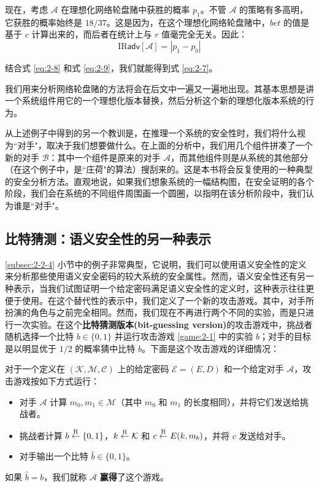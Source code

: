 现在，考虑 $\mathcal{A}$ 在理想化网络轮盘赌中获胜的概率 $p_1$。不管 $\mathcal{A}$ 的策略有多高明，它获胜的概率始终是 $18/37$。这是因为，在这个理想化网络轮盘赌中，$\mathit{bet}$ 的值是基于 $c$ 计算出来的，而后者在统计上与 $r$ 值毫完全无关。因此：
\begin{equation}\label{eq:2-9}
\mathrm{IR}\mathsf{adv}[\mathcal{A}]
=
|p_1-p_0|
\end{equation}

结合式 \ref{eq:2-8} 和式 \ref{eq:2-9}，我们就能得到式 \ref{eq:2-7}。

\vspace{5pt}

我们用来分析网络轮盘赌的方法将会在后文中一遍又一遍地出现。其基本思想是讲一个系统组件用它的一个理想化版本替换，然后分析这个新的理想化版本系统的行为。

从上述例子中得到的另一个教训是，在推理一个系统的安全性时，我们将什么视为``对手"，取决于我们想要做什么。在上面的分析中，我们用几个组件拼凑了一个新的对手 $\mathcal{B}$：其中一个组件是原来的对手 $\mathcal{A}$，而其他组件则是从系统的其他部分（在这个例子中，是``庄荷"的算法）搜刮来的。这是本书将会反复使用的一种典型的安全分析方法。直观地说，如果我们想象系统的一幅结构图，在安全证明的各个阶段，我们会在系统的不同组件周围画一个圆圈，以指明在该分析阶段中，我们认为谁是``对手"。

\subsection{比特猜测：语义安全性的另一种表示}\label{subsec:2-2-5}

\ref{subsec:2-2-4} 小节中的例子非常典型，它说明，我们可以使用语义安全性的定义来分析那些使用语义安全密码的较大系统的安全属性。然而，语义安全性还有另一种表示，当我们试图证明一个给定密码满足语义安全性的定义时，这种表示往往更便于使用。在这个替代性的表示中，我们定义了一个新的攻击游戏。其中，对手所扮演的角色与之前完全相同。然而，我们现在不再进行两个不同的实验，而是只进行一次实验。在这个\textbf{比特猜测版本(bit-guessing version)}的攻击游戏中，挑战者随机选择一个比特 $b\in\{0,1\}$ 并运行攻击游戏 \ref{game:2-1} 中的实验 $b$；对手的目标是以明显优于 $1/2$ 的概率猜中比特 $b$。下面是这个攻击游戏的详细情况：

\begin{game}\label{game:2-4}
对于一个定义在 $(\mathcal{K},\mathcal{M},\mathcal{C})$ 上的给定密码 $\mathcal{E}=(E,D)$ 和一个给定对手 $\mathcal{A}$，攻击游戏按如下方式运行：
\begin{itemize}
	\item 对手 $\mathcal{A}$ 计算 $m_0,m_1\in\mathcal{M}$（其中 $m_0$ 和 $m_1$ 的长度相同），并将它们发送给挑战者。
	\item 挑战者计算 $b\overset{\rm R}\leftarrow\{0,1\}$，$k\overset{\rm R}\leftarrow\mathcal{K}$ 和 $c\overset{\rm R}\leftarrow E(k,m_b)$，并将 $c$ 发送给对手。
	\item 对手输出一个比特 $\hat b\in\{0,1\}$。
\end{itemize}
如果 $\hat b=b$，我们就称 $\mathcal{A}$ \textbf{赢得}了这个游戏。
\end{game}

